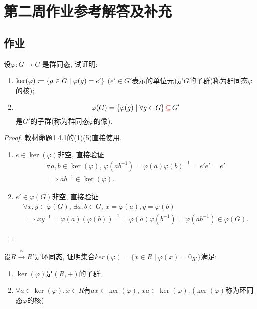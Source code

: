 \documentclass{../solutions-cn}
\begin{document}
\section*{第二周作业参考解答及补充}

\subsection*{作业}

\begin{exercise}[习题1.4.1]
    设$\varphi:G\to G^\prime$是群同态, 试证明:
    \begin{enumerate}[(1)]
        \item $\ker(\varphi) \mathrel{\coloneqq} \{g \in G \mid \varphi(g) = e'\}$ $(e' \in G'$表示的单位元)是$G$的子群(称为群同态$\varphi$的核);
        \item 
        \[
            \varphi(G) = \{\varphi(g) \mid \forall g \in G\} \,\textcolor{red}{\subseteq}\, G'
        \]
        是$G'$的子群(称为群同态$\varphi$的像).
    \end{enumerate}
\end{exercise}

\begin{proof}
    教材命题1.4.1的(1)(5)直接使用.
\begin{enumerate}[(1)]
    \item $e \in \ker(\varphi)$非空, 直接验证
    \[
    \begin{gathered}
        \forall a, b \in \ker(\varphi),\, \varphi(ab^{-1}) = \varphi(a)\varphi(b)^{-1} = e'e' = e'\\
        \implies ab^{-1} \in \ker(\varphi).
    \end{gathered}
    \]
    \item $e' \in \varphi(G)$非空, 直接验证
    \[
    \begin{gathered}
        \forall x, y \in \varphi(G),\, \exists a, b \in G,\, x = \varphi(a), y = \varphi(b)\\
        \implies xy^{-1} = \varphi(a)(\varphi(b))^{-1} = \varphi(a)\varphi(b^{-1}) = \varphi(ab^{-1}) \in \varphi(G).
    \end{gathered}
    \]
\end{enumerate}
\end{proof}

\begin{exercise}[习题1.4.3]
    设$R \overset{\varphi}\to R'$是环同态, 证明集合$ker(\varphi) = \{x \in R \mid \varphi(x) = 0_{R'}\}$满足:
    \begin{enumerate}[(1)]
        \item $\ker(\varphi)$是$(R, +)$的子群;
        \item $\forall a \in \ker (\varphi), x \in R$有$ax \in \ker(\varphi)$, $xa \in \ker (\varphi)$. ($\ker(\varphi)$称为环同态$\varphi$的核)
    \end{enumerate}
\end{exercise}
\end{document}
